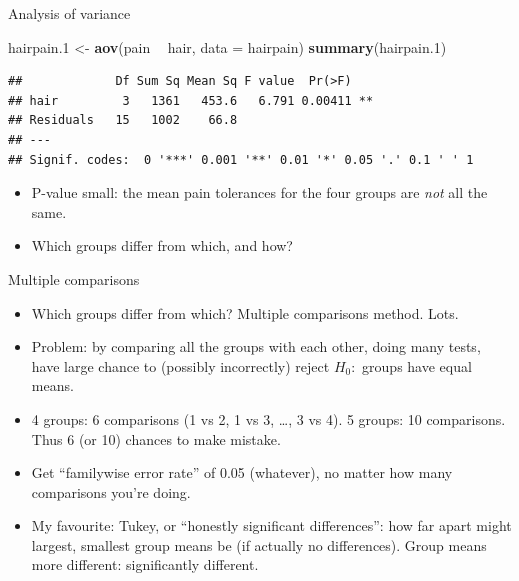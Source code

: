 \documentclass[ignorenonframetext,]{beamer}
\newenvironment{Shaded}{\begin{snugshade}}{\end{snugshade}}
\newcommand{\DataTypeTok}[1]{\textcolor[rgb]{0.13,0.29,0.53}{#1}}
\newcommand{\FloatTok}[1]{\textcolor[rgb]{0.00,0.00,0.81}{#1}}
\newcommand{\KeywordTok}[1]{\textcolor[rgb]{0.13,0.29,0.53}{\textbf{#1}}}
\newcommand{\NormalTok}[1]{#1}
\newcommand{\OperatorTok}[1]{\textcolor[rgb]{0.81,0.36,0.00}{\textbf{#1}}}
\newcommand{\StringTok}[1]{\textcolor[rgb]{0.31,0.60,0.02}{#1}}
\begin{document}
\begin{frame}[fragile]{Analysis of variance}
\protect\hypertarget{analysis-of-variance-2}{}

\small

\begin{Shaded}
\begin{Highlighting}[]
\NormalTok{hairpain}\FloatTok{.1}\NormalTok{ <-}\StringTok{ }\KeywordTok{aov}\NormalTok{(pain }\OperatorTok{~}\StringTok{ }\NormalTok{hair, }\DataTypeTok{data =}\NormalTok{ hairpain)}
\KeywordTok{summary}\NormalTok{(hairpain}\FloatTok{.1}\NormalTok{)}
\end{Highlighting}
\end{Shaded}

\begin{verbatim}
##             Df Sum Sq Mean Sq F value  Pr(>F)   
## hair         3   1361   453.6   6.791 0.00411 **
## Residuals   15   1002    66.8                   
## ---
## Signif. codes:  0 '***' 0.001 '**' 0.01 '*' 0.05 '.' 0.1 ' ' 1
\end{verbatim}

\normalsize

\begin{itemize}
\item
  P-value small: the mean pain tolerances for the four groups are
  \emph{not} all the same.
\item
  Which groups differ from which, and how?
\end{itemize}

\end{frame}

\begin{frame}{Multiple comparisons}
\protect\hypertarget{multiple-comparisons}{}

\begin{itemize}
\item
  Which groups differ from which? Multiple comparisons method. Lots.
\item
  Problem: by comparing all the groups with each other, doing many
  tests, have large chance to (possibly incorrectly) reject \(H_0:\)
  groups have equal means.
\item
  4 groups: 6 comparisons (1 vs 2, 1 vs 3, \ldots, 3 vs 4). 5 groups: 10
  comparisons. Thus 6 (or 10) chances to make mistake.
\item
  Get ``familywise error rate'' of 0.05 (whatever), no matter how many
  comparisons you're doing.
\item
  My favourite: Tukey, or ``honestly significant differences'': how far
  apart might largest, smallest group means be (if actually no
  differences). Group means more different: significantly different.
\end{itemize}

\end{frame}
\end{document}
